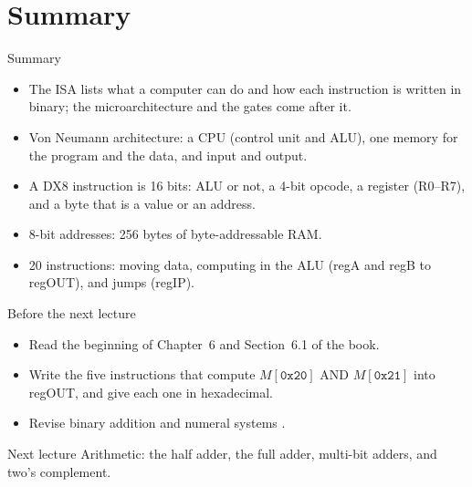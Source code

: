 \documentclass[10pt]{wosm-slides}
\newcommand*\hexnum[1]{\texttt{0x#1}}
\begin{document}
\section{Summary}

\begin{frame}{Summary}
  \begin{itemize}
    \item The ISA lists what a computer can do and how each instruction is written
      in binary; the microarchitecture and the gates come after it.
    \item Von Neumann architecture: a CPU (control unit and ALU), one memory for the
      program and the data, and input and output.
    \item A DX8 instruction is 16 bits: ALU or not, a 4-bit opcode, a register
      (R0--R7), and a byte that is a value or an address.
    \item 8-bit addresses: 256 bytes of byte-addressable RAM.
    \item 20 instructions: moving data, computing in the ALU (regA and regB to
      regOUT), and jumps (regIP).
  \end{itemize}
\end{frame}

\begin{frame}{Before the next lecture}
  \begin{itemize}
    \item Read the beginning of Chapter~6 and Section~6.1 of the book.
    \item Write the five instructions that compute $M[\hexnum{20}]$ AND $M[\hexnum{21}]$
      into regOUT, and give each one in hexadecimal.
    \item Revise binary addition and numeral systems .
  \end{itemize}

  \begin{block}{Next lecture }
    Arithmetic: the half adder, the full adder, multi-bit adders, and two's
    complement.
  \end{block}
\end{frame}
\end{document}
